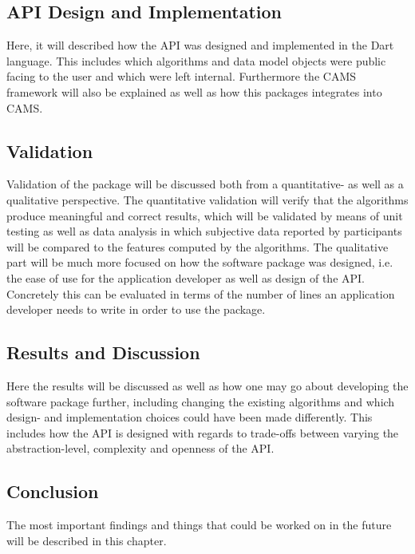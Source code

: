 \subsection*{API Design and Implementation}
Here, it will described how the API was designed and implemented in the Dart language. This includes which algorithms and data model objects were public facing to the user and which were left internal. Furthermore the CAMS framework will also be explained as well as how this packages integrates into CAMS.

\subsection*{Validation}
Validation of the package will be discussed both from a quantitative- as well as a qualitative perspective. The quantitative validation will verify that the algorithms produce meaningful and correct results, which will be validated by means of unit testing as well as data analysis in which subjective data reported by participants will be compared to the features computed by the algorithms. The qualitative part will be much more focused on how the software package was designed, i.e. the ease of use for the application developer as well as design of the API. Concretely this can be evaluated in terms of the number of lines an application developer needs to write in order to use the package.

\subsection*{Results and Discussion}
Here the results will be discussed as well as how one may go about developing the software package further, including changing the existing algorithms and which design- and implementation choices could have been made differently. This includes how the API is designed with regards to trade-offs between varying the abstraction-level, complexity and openness of the API.

\subsection*{Conclusion}
The most important findings and things that could be worked on in the future will be described in this chapter.

